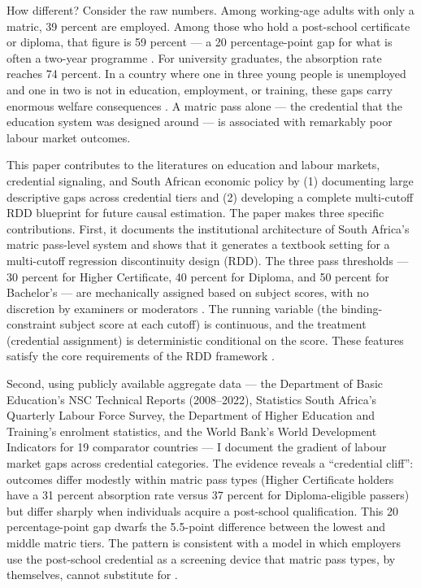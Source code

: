 \documentclass[12pt]{article}
\begin{document}
How different? Consider the raw numbers. Among working-age adults with only a matric, 39 percent are employed. Among those who hold a post-school certificate or diploma, that figure is 59 percent --- a 20 percentage-point gap for what is often a two-year programme \citep{statssa2019qlfs}. For university graduates, the absorption rate reaches 74 percent. In a country where one in three young people is unemployed and one in two is not in education, employment, or training, these gaps carry enormous welfare consequences \citep{banerjee2008workplace, bhorat2015youth}. A matric pass alone --- the credential that the education system was designed around --- is associated with remarkably poor labour market outcomes.

This paper contributes to the literatures on education and labour markets, credential signaling, and South African economic policy by (1) documenting large descriptive gaps across credential tiers and (2) developing a complete multi-cutoff RDD blueprint for future causal estimation. The paper makes three specific contributions. First, it documents the institutional architecture of South Africa's matric pass-level system and shows that it generates a textbook setting for a multi-cutoff regression discontinuity design (RDD). The three pass thresholds --- 30 percent for Higher Certificate, 40 percent for Diploma, and 50 percent for Bachelor's --- are mechanically assigned based on subject scores, with no discretion by examiners or moderators \citep{dbe2022nsc}. The running variable (the binding-constraint subject score at each cutoff) is continuous, and the treatment (credential assignment) is deterministic conditional on the score. These features satisfy the core requirements of the RDD framework \citep{lee2010regression, imbens2008regression}.

Second, using publicly available aggregate data --- the Department of Basic Education's NSC Technical Reports (2008--2022), Statistics South Africa's Quarterly Labour Force Survey, the Department of Higher Education and Training's enrolment statistics, and the World Bank's World Development Indicators for 19 comparator countries --- I document the gradient of labour market gaps across credential categories. The evidence reveals a ``credential cliff'': outcomes differ modestly within matric pass types (Higher Certificate holders have a 31 percent absorption rate versus 37 percent for Diploma-eligible passers) but differ sharply when individuals acquire a post-school qualification. This 20 percentage-point gap dwarfs the 5.5-point difference between the lowest and middle matric tiers. The pattern is consistent with a model in which employers use the post-school credential as a screening device that matric pass types, by themselves, cannot substitute for \citep{spence1973job}.
\end{document}
